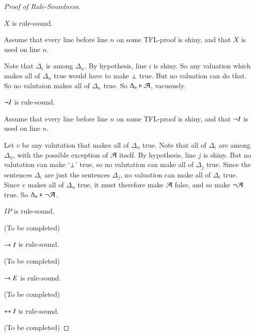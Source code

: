 \begin{proof}[Proof of Rule-Soundness]
    \begin{claim}[7]
        $X$ is rule-sound.
    \end{claim}
    Assume that every line before line $n$ on some TFL-proof is shiny, and that $X$ is used on line $n$.
    \begin{fitchproof}
         
    \end{fitchproof}
    Note that $\Delta_i$ is among $\Delta_n$. By hypothesis, line $i$ is shiny. So any valuation which makes all of $\Delta_n$ true would have to make $\bot$ true. But no valuation can do that. So no valutaion makes all of $\Delta_n$ true. So $\Delta_n \vDash \mathcal{A}$, vacuously.


    \begin{claim}[8]
        $\neg I$ is rule-sound.
    \end{claim}
    Assume that every line before line $n$ on some TFL-proof is shiny, and that $\neg I$ is used on line $n$.
    \begin{fitchproof}
        \open
        \close
         
    \end{fitchproof}
    Let $v$ be any valutation that makes all of $\Delta_n$ true. Note that all of $\Delta_i$ are among $\Delta_n$, with the possible exception of $\mathcal{A}$ itself. By hypothesis, line $j$ is shiny. But no valutation can make `$\bot$' true, so no valutation can make all of $\Delta_j$ true. Since the sentences $\Delta_i$ are just the sentences $\Delta_j$, no valuation can make all of $\Delta_i$ true. Since $v$ makes all of $\Delta_n$ true, it must therefore make $\mathcal{A}$ false, and so make $\neg \mathcal{A}$ true. So $\Delta_n\vDash \neg\mathcal{A}$.

    \begin{claim}[9]
        $IP$ is rule-sound.
    \end{claim}
    (To be completed)

    \begin{claim}[10]
        $\rightarrow I$ is rule-sound.
    \end{claim}
    (To be completed)


    \begin{claim}[11]
        $\rightarrow E$ is rule-sound.
    \end{claim}
    (To be completed)


    \begin{claim}[12]
        $\leftrightarrow I$ is rule-sound.
    \end{claim}
    (To be completed)



\end{proof}
